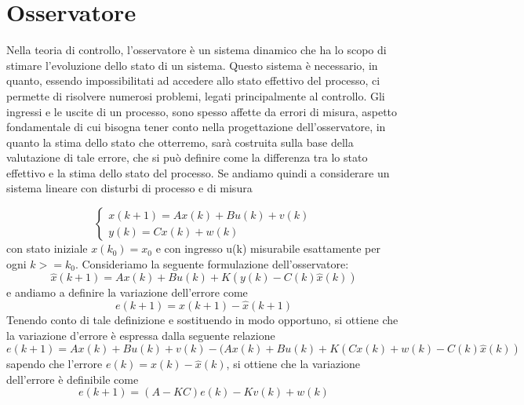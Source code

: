\documentclass{article}
\begin{document}
\section{Osservatore}
Nella teoria di controllo, l'osservatore è un sistema dinamico che ha lo scopo di stimare l'evoluzione dello stato di un sistema. Questo sistema è necessario, in quanto, essendo impossibilitati ad accedere allo stato effettivo del processo, ci permette di risolvere numerosi problemi, legati principalmente al controllo. Gli ingressi e le uscite di un processo, sono spesso affette da errori di misura, aspetto fondamentale di cui bisogna  tener conto  nella progettazione dell'osservatore, in quanto la stima dello stato che otterremo, sarà costruita sulla base della valutazione di tale errore, che si può definire come la differenza tra lo stato effettivo e la stima dello stato del processo.
Se andiamo quindi a considerare un sistema lineare con disturbi di processo e di misura

\[
\begin{cases} 
x(k+1)=Ax(k)+Bu(k)+v(k)\\
y(k)=Cx(k)+ w(k)
\end{cases}
\]
con stato iniziale $x(k_0)=x_0$ e con ingresso u(k) misurabile  esattamente per ogni $k>=k_0$.
Consideriamo la seguente formulazione dell'osservatore:
\[\hat{x}(k+1)=Ax(k)+Bu(k)+K(y(k)-C(k)\hat{x}(k))\]
e andiamo a definire la variazione dell'errore come  
\[{e}(k+1)={x}(k+1)-{\hat{x}}(k+1)\]
Tenendo conto di tale definizione e sostituendo in modo opportuno, si ottiene che la variazione d'errore è espressa dalla seguente relazione
\[{e}(k+1)=Ax(k)+Bu(k)+v(k)-(Ax(k)+Bu(k)+K(Cx(k)+w(k)-C(k)\hat{x}(k))\]
sapendo che l'errore $e(k)=x(k)-\hat{x}(k)$, si ottiene che la variazione dell'errore è definibile come 
\[{e}(k+1)=(A-KC)e(k)-Kv(k)+w(k)\]




 
\end{document}
